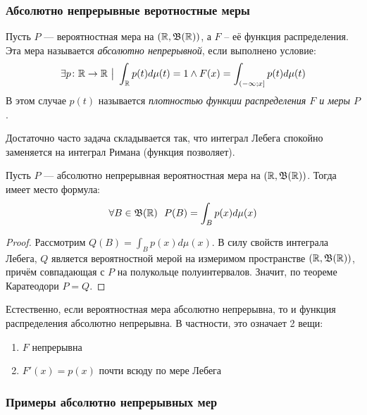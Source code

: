 \subsubsection{Абсолютно непрерывные веротностные меры}

\begin{definition}
	Пусть $P$ --- вероятностная мера на $(\mathbb{R}, \mathfrak{B}(\mathbb{R}))$, а $F$ -- её функция распределения. Эта мера называется \textit{абсолютно непрерывной}, если выполнено условие:
	\[
		\exists p \colon \mathbb{R} \to \mathbb{R} \ \big|\  \int_{\mathbb{R}} p(t)d\mu(t) = 1 \wedge F(x) = \int_{\left(-\infty; x\right]} p(t)d\mu(t)
	\]
	В этом случае $p(t)$ называется \textit{плотностью функции распределения $F$ и меры $P$}.
\end{definition}

\begin{note}
	Достаточно часто задача складывается так, что интеграл Лебега спокойно заменяется на интеграл Римана (функция позволяет).
\end{note}

\begin{proposition}
	Пусть $P$ --- абсолютно непрерывная вероятностная мера на $(\mathbb{R}, \mathfrak{B}(\mathbb{R}))$. Тогда имеет место формула:
	\[
		\forall B \in \mathfrak{B}(\mathbb{R})\ \ P(B) = \int_B p(x)d\mu(x)
	\]
\end{proposition}

\begin{proof}
	Рассмотрим $Q(B) = \int_B p(x)d\mu(x)$. В силу свойств интеграла Лебега, $Q$ является вероятностной мерой на измеримом пространстве $(\mathbb{R}, \mathfrak{B}(\mathbb{R}))$, причём совпадающая с $P$ на полукольце полуинтервалов. Значит, по теореме Каратеодори $P = Q$.
\end{proof}

\begin{note}
	Естественно, если вероятностная мера абсолютно непрерывна, то и функция распределения абсолютно непрерывна. В частности, это означает 2 вещи:
	\begin{enumerate}
		\item $F$ непрерывна
		
		\item $F'(x) = p(x)$ почти всюду по мере Лебега
	\end{enumerate}
\end{note}

\subsubsection*{Примеры абсолютно непрерывных мер}


